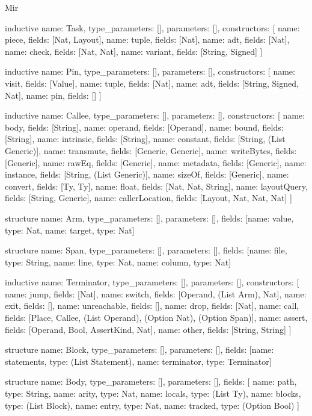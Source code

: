 \begin{lexlean}{Mir}
\begin{semanticmodule}
inductive{
  name: Task,
  type_parameters: [],
  parameters: [],
  constructors: [
    {name: piece, fields: [Nat, Layout]},
    {name: tuple, fields: [Nat]},
    {name: adt, fields: [Nat]},
    {name: check, fields: [Nat, Nat]},
    {name: variant, fields: [String, Signed]}
  ]
}

inductive{
  name: Pin,
  type_parameters: [],
  parameters: [],
  constructors: [
    {name: visit, fields: [Value]},
    {name: tuple, fields: [Nat]},
    {name: adt, fields: [String, Signed, Nat]},
    {name: pin, fields: []}
  ]
}

inductive{
  name: Callee,
  type_parameters: [],
  parameters: [],
  constructors: [
    {name: body, fields: [String]},
    {name: operand, fields: [Operand]},
    {name: bound, fields: [String]},
    {name: intrinsic, fields: [String]},
    {name: constant, fields: [String, (List Generic)]},
    {name: transmute, fields: [Generic, Generic]},
    {name: writeBytes, fields: [Generic]},
    {name: rawEq, fields: [Generic]},
    {name: metadata, fields: [Generic]},
    {name: instance, fields: [String, (List Generic)]},
    {name: sizeOf, fields: [Generic]},
    {name: convert, fields: [Ty, Ty]},
    {name: float, fields: [Nat, Nat, String]},
    {name: layoutQuery, fields: [String, Generic]},
    {name: callerLocation, fields: [Layout, Nat, Nat, Nat]}
  ]
}

structure{
  name: Arm,
  type_parameters: [],
  parameters: [],
  fields: [{name: value, type: Nat}, {name: target, type: Nat}]
}

structure{
  name: Span,
  type_parameters: [],
  parameters: [],
  fields: [{name: file, type: String}, {name: line, type: Nat}, {name: column, type: Nat}]
}

inductive{
  name: Terminator,
  type_parameters: [],
  parameters: [],
  constructors: [
    {name: jump, fields: [Nat]},
    {name: switch, fields: [Operand, (List Arm), Nat]},
    {name: exit, fields: []},
    {name: unreachable, fields: []},
    {name: drop, fields: [Nat]},
    {name: call, fields: [Place, Callee, (List Operand), (Option Nat), (Option Span)]},
    {name: assert, fields: [Operand, Bool, AssertKind, Nat]},
    {name: other, fields: [String, String]}
  ]
}

structure{
  name: Block,
  type_parameters: [],
  parameters: [],
  fields: [{name: statements, type: (List Statement)}, {name: terminator, type: Terminator}]
}

structure{
  name: Body,
  type_parameters: [],
  parameters: [],
  fields: [
    {name: path, type: String},
    {name: arity, type: Nat},
    {name: locals, type: (List Ty)},
    {name: blocks, type: (List Block)},
    {name: entry, type: Nat},
    {name: tracked, type: (Option Bool)}
  ]
}


\end{semanticmodule}
\end{lexlean}
